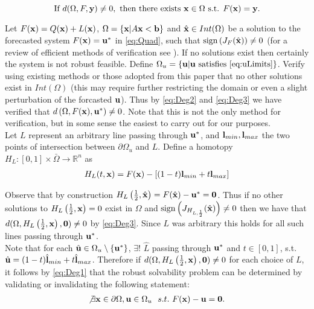 \begin{equation}\label{eq:Deg2}
\text{If }d(\Omega,F,\bold y)\neq 0,\text{ then there exists }\bold x\in\Omega\text{ s.t. }F(\bold x)=\bold y. 
\end{equation}


Let $F(\bold x)=Q(\bold x)+L(\bold x)$, $\Omega=\{\bold x| A\bold x< \bold b\}$ and $\hat{\bold x}\in Int(\Omega)$ be a solution to the forecasted system $F(\bold x)=\bold u^*$ in \ref{eq:Quad}, such that $\operatorname{sign}\left(J_{F}(\hat{\bold x})\right)\neq 0$ (for a review of efficient methods of verification see \cite{GRIEWANK2014}). 
If no solutions exist then certainly the system is not robust feasible. Define $\Omega_u=\{\bold u| \bold u\text{ satisfies }\ref{eq:uLimits}\}$.
Verify using existing methods or those adopted from this paper that no other solutions exist in $Int(\Omega)$ (this may require further restricting the domain or even a slight perturbation of the forcasted $\bold u$). 
Thus by \ref{eq:Deg2} and \ref{eq:Deg3} we have verified that $d\left(\Omega, F(\bold x), \bold u^*\right)\neq 0$. 
Note that this is not the only method for verification, but in some sense the easiest to carry out for our purposes. \\

Let $L$ represent an arbitrary line passing through $\bold u^*$, and $\bold l_{min},\bold l_{max}$ the two points of intersection between $\partial\Omega_u$ and $L$. 
Define a homotopy $H_L : [0,1]\times\bar{\Omega}\rightarrow\mathbb{R}^n$ as 
\begin{align}
H_L(t,\bold x) = F(\bold x)-\left[(1-t)\bold l_{min}+t\bold l_{max}\right] \label{eq:Homo}
\end{align}

Observe that by construction $H_L\left(\frac{1}{2},\hat{\bold x}\right)=F(\hat{\bold x})-\bold u^*=\textbf{0}$. 
Thus if no other solutions to $H_L\left(\frac{1}{2},\bold x\right)=0$ exist in $\Omega$ and $\operatorname{sign}\left(J_{H_{L,\frac{1}{2}}}(\hat{\bold x})\right)\neq 0$ then we have that $d(\Omega,H_L\left(\frac{1}{2},\bold x\right),\textbf{0})\neq 0$ by \ref{eq:Deg3}. 
Since $L$ was arbitrary this holds for all such lines passing through $\bold u^*$.\\
Note that for each $\hat{\bold u}\in\Omega_u\setminus\{\bold u^*\}$, $\exists !$ $\hat{L}$ passing through $\bold u^*$ and $t\in[0,1]$,  s.t. $\hat{\bold u}=(1-t)\hat{\bold l}_{min}+t\hat{\bold l}_{max}$. 
Therefore if $d(\Omega,H_L\left(\frac{1}{2},\bold x\right),\bold 0)\neq 0$ for each choice of $L$, it follows by \ref{eq:Deg1} that the robust solvability problem can be determined by validating or invalidating the following statement:
\begin{align}
\not\exists \bold x\in\partial\Omega, \bold u\in\Omega_u \ \ s.t. \ F(\bold x)-\bold u=\bold 0. \label{eq:RSForm}
\end{align}

